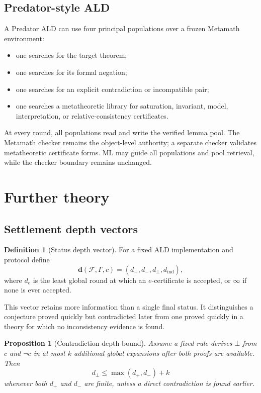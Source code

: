 \documentclass[11pt]{article}
\newtheorem{proposition}[theorem]{Proposition}
\theoremstyle{definition}
\newtheorem{definition}[theorem]{Definition}
\theoremstyle{remark}
\newcommand{\F}{\mathcal F}
\newcommand{\Gammaa}{\Gamma}
\newcommand{\bottomf}{\bot}
\begin{document}
\subsection{Predator-style ALD}
A Predator ALD can use four principal populations over a frozen Metamath environment:
\begin{itemize}
  \item one searches for the target theorem;
  \item one searches for its formal negation;
  \item one searches for an explicit contradiction or incompatible pair;
  \item one searches a metatheoretic library for saturation, invariant, model, interpretation, or relative-consistency certificates.
\end{itemize}
At every round, all populations read and write the verified lemma pool. The Metamath checker remains the object-level authority; a separate checker validates metatheoretic certificate forms. ML may guide all populations and pool retrieval, while the checker boundary remains unchanged.

\section{Further theory}

\subsection{Settlement depth vectors}
\begin{definition}[Status depth vector]
For a fixed ALD implementation and protocol define
\[
\mathbf d(\F,\Gammaa,c)=
(d_{+},d_{-},d_{\bot},d_{\mathrm{ind}}),
\]
where $d_e$ is the least global round at which an $e$-certificate is accepted, or $\infty$ if none is ever accepted.
\end{definition}

This vector retains more information than a single final status. It distinguishes a conjecture proved quickly but contradicted later from one proved quickly in a theory for which no inconsistency evidence is found.

\begin{proposition}[Contradiction depth bound]
Assume a fixed rule derives $\bottomf$ from $c$ and $\neg c$ in at most $k$ additional global expansions after both proofs are available. Then
\[
d_{\bot}\le \max(d_{+},d_{-})+k
\]
whenever both $d_{+}$ and $d_{-}$ are finite, unless a direct contradiction is found earlier.
\end{proposition}
\end{document}
